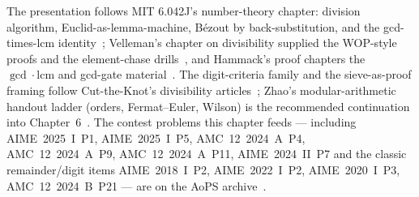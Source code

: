 \chapternotes
The presentation follows MIT 6.042J's number-theory chapter: division
algorithm, Euclid-as-lemma-machine, B\'ezout by back-substitution, and the
gcd-times-lcm identity~\cite{mcs}; Velleman's chapter on divisibility
supplied the WOP-style proofs and the element-chase drills~\cite{velleman},
and Hammack's proof chapters the $\gcd\cdot\mathrm{lcm}$ and
gcd-gate material~\cite{hammack}. The digit-criteria family and the
sieve-as-proof framing follow Cut-the-Knot's divisibility
articles~\cite{cuttheknot}; Zhao's modular-arithmetic handout ladder
(orders, Fermat--Euler, Wilson) is the recommended continuation into
Chapter~6~\cite{zhao}. The contest problems this chapter feeds ---
including AIME~2025~I~P1, AIME~2025~I~P5, AMC~12~2024~A~P4, AMC~12~2024~A~P9,
AMC~12~2024~A~P11, AIME~2024~II~P7 and the classic remainder/digit items
AIME~2018~I~P2, AIME~2022~I~P2, AIME~2020~I~P3, AMC~12~2024~B~P21 --- are on
the AoPS archive~\cite{aops-amc}.
